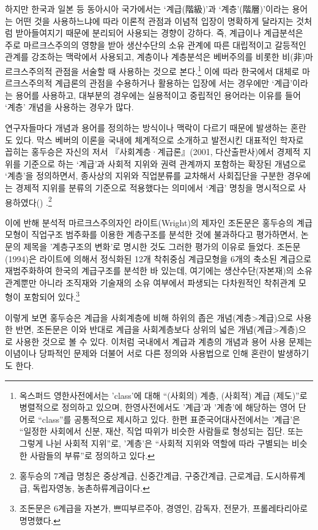 \documentclass[
  letterpaper,
  DIV=11,
  numbers=noendperiod]{scrartcl}
\begin{document}
하지만 한국과 일본 등 동아시아 국가에서는 `계급(階級)'과
`계층'(階層)'이라는 용어는 어떤 것을 사용하느냐에 따라 이론적 관점과
이념적 입장이 명확하게 달라지는 것처럼 받아들여지기 때문에 분리되어
사용되는 경향이 강하다. 즉, 계급이나 계급분석은 주로 마르크스주의의
영향을 받아 생산수단의 소유 관계에 따른 대립적이고 갈등적인 관계를
강조하는 맥락에서 사용되고, 계층이나 계층분석은 베버주의를 비롯한
비(非)마르크스주의적 관점을 서술할 때 사용하는 것으로 본다.\footnote{옥스퍼드
  영한사전에서는 'class'에 대해 ``(사회의) 계층, (사회적) 계급
  (제도)''로 병렬적으로 정의하고 있으며, 한영사전에서도 '계급'과
  '계층'에 해당하는 영어 단어로 ``class''를 공통적으로 제시하고 있다.
  한편 표준국어대사전에서는 '계급'은 ``일정한 사회에서 신분, 재산, 직업
  따위가 비슷한 사람들로 형성되는 집단. 또는 그렇게 나뉜 사회적
  지위''로, '계층'은 ``사회적 지위와 역할에 따라 구별되는 비슷한
  사람들의 부류''로 정의하고 있다.} 이에 따라 한국에서 대체로
마르크스주의적 계급론의 관점을 수용하거나 활용하는 입장에 서는 경우에만
`계급'이라는 용어를 사용하고, 대부분의 경우에는 실용적이고 중립적인
용어라는 이유를 들어 `계층' 개념을 사용하는 경우가 많다.

연구자들마다 개념과 용어를 정의하는 방식이나 맥락이 다르기 때문에
발생하는 혼란도 있다. 막스 베버의 이론을 국내에 체계적으로 소개하고
발전시킨 대표적인 학자로 꼽히는 홍두승은 자신의 저서
『사회계층·계급론』(2001, 다산출판사)에서 경제적 지위를 기준으로 하는
`계급'과 사회적 지위와 권력 관계까지 포함하는 확장된 개념으로 `계층'을
정의하면서, 종사상의 지위와 직업분류를 교차해서 사회집단을 구분한
경우에는 경제적 지위를 분류의 기준으로 적용했다는 의미에서 `계급' 명칭을
명시적으로 사용하였다()
.\footnote{홍두승의 7계급 명칭은 중상계급, 신중간계급, 구중간계급,
  근로계급, 도시하류계급, 독립자영농, 농촌하류계급이다.}

이에 반해 분석적 마르크스주의자인 라이트(Wright)의 제자인 조돈문은
홍두승의 계급모형이 직업구조 범주화를 이용한 계층구조를 분석한 것에
불과하다고 평가하면서, 논문의 제목을 '계층구조의 변화'로 명시한 것도
그러한 평가의 이유로 들었다. 조돈문(1994)은 라이트에 의해서 정식화된
12개 착취중심 계급모형을 6개의 축소된 계급으로 재범주화하여 한국의
계급구조를 분석한 바 있는데, 여기에는 생산수단(자본재)의 소유관계뿐만
아니라 조직재와 기술재의 소유 여부에서 파생되는 다차원적인 착취관계
모형이 포함되어 있다.\footnote{조돈문은 6계급을 자본가, 쁘띠부르주아,
  경영인, 감독자, 전문가, 프롤레타리아로 명명했다.}

이렇게 보면 홍두승은 계급을 사회계층에 비해 하위의 좁은
개념(계층\textgreater 계급)으로 사용한 반면, 조돈문은 이와 반대로 계급을
사회계층보다 상위의 넓은 개념(계급\textgreater 계층)으로 사용한 것으로
볼 수 있다. 이처럼 국내에서 계급과 계층의 개념과 용어 사용 문제는
이념이나 당파적인 문제와 더불어 서로 다른 정의와 사용법으로 인해 혼란이
발생하기도 한다.
\end{document}
